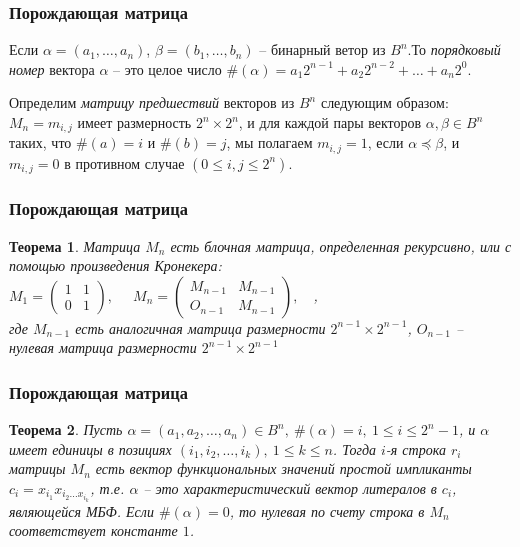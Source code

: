 \documentclass[14pt]{beamer}
\theoremstyle{plain} %
\newtheorem{Theore}{Теорема}
\theoremstyle{remark}
\newcommand{\al}{\alpha}
\newcommand{\be}{\beta}
\begin{document}
\begin{frame}
\frametitle{Порождающая матрица}
Если $\alpha = (a_1, \dots, a_n)$, $\beta = (b_1, \dots, b_n)$ -- 
бинарный ветор из $B^n$.То \emph{порядковый номер} вектора
$\alpha$ -- это целое число 
$\#(\alpha) = a_1 2^{n-1} + a_2 2^{n-2} + \dots + a_n 2^0$.\par
Определим \emph{матрицу предшествий} векторов из $B^n$ следующим образом: 
$M_n = m_{i,j}$ имеет размерность $2^n \times 2^n$, и для каждой пары векторов
$\al, \be \in B^n$ таких, что $\#(a) = i$ и $\#(b) = j$, мы полагаем
$m_{i,j} = 1$, если $\al \preceq \be$, и $m_{i,j} = 0$ в противном случае $(0 \leq i, j \leq 2^n)$.
\end{frame}

\begin{frame}
\frametitle{Порождающая матрица}

\begin{Theore}
 Матрица $M_n$ есть блочная матрица, определенная рекурсивно, или с помощью 
 произведения Кронекера:\\
 
 $M_1 = \begin{pmatrix}
        1 & 1\\
        0 & 1
       \end{pmatrix}, \quad$ 
 $M_n = \begin{pmatrix}
        M_{n-1} & M_{n-1}\\
        O_{n-1} & M_{n-1}
       \end{pmatrix},\quad$, \\
  где $M_{n-1}$ есть аналогичная матрица размерности $2^{n-1} \times 2^{n-1}$,
  $O_{n-1}$ -- нулевая матрица размерности $2^{n-1} \times 2^{n-1}$
\end{Theore}
\end{frame}


\begin{frame}
\frametitle{Порождающая матрица}
\begin{Theore}\label{Th_fun_values_implicants}
 Пусть $\al = (a_1, a_2, \dots, a_n) \in B^n,\ \#(\al) = i,\ 
 1 \leq i \leq 2^n -1 $,
 и $\al$ имеет единицы в позициях $(i_1, i_2, \dots,i_k),\ 1 \leq k \leq n$.
 Тогда $i$-я строка $r_i$ матрицы $M_n$ есть вектор функциональных значений
 простой импликанты $c_i = x_{i_1}x_{i_2\dots x_{i_k}}$, т.е. $\al$ -- это 
 характеристический вектор литералов в $c_i$, являющейся МБФ.
 Если $\#(\al)=0$, то нулевая по счету строка в $M_n$ соответствует константе $1$. 
\end{Theore}
\end{frame}
\end{document}
